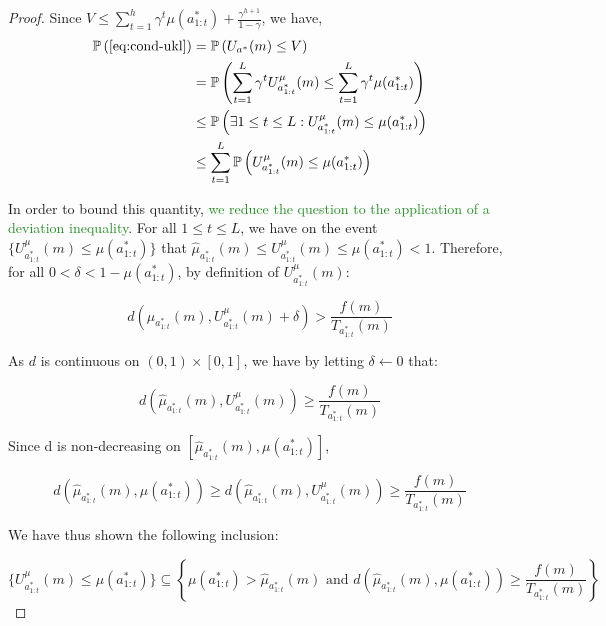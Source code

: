 \documentclass[runningheads]{llncs}
\newcommand{\diff}[1]{\textcolor{ForestGreen}{#1}}
\begin{document}
\begin{proof}
Since $V \leq \sum_{t=1}^h \gamma^t \mu(a^*_{1:t}) + \frac{\gamma^{h+1}}{1-\gamma}$, we have,
\begin{align*}
   \mathbb{P}\left(\eqref{eq:cond-ukl}\right) &=  \mathbb{P}\left(U_{a^*}(m) \leq V\right)\\
    &= \mathbb{P}\left(\sum_{t=1}^L \gamma^t U^{\mu}_{a^*_{1:t}}(m) \leq \sum_{t=1}^L \gamma^t \mu(a^*_{1:t})\right)\\
    &\leq \mathbb{P}\left(\exists 1\leq t \leq L : U^{\mu}_{a^*_{1:t}}(m) \leq \mu(a^*_{1:t})\right) \\
    &\leq \sum_{t=1}^L\mathbb{P}\left(U^{\mu}_{a^*_{1:t}}(m) \leq \mu(a^*_{1:t})\right)
\end{align*}

In order to bound this quantity, \diff{we reduce the question to the application of a deviation inequality}. For all $1\leq t\leq L$, we have on the event $\{U^{\mu}_{a^*_{1:t}}(m) \leq \mu(a^*_{1:t})\}$ that $\hat{\mu}_{a^*_{1:t}}(m) \leq U^{\mu}_{a^*_{1:t}}(m) \leq \mu(a^*_{1:t}) < 1$. Therefore, for all $0 < \delta < 1 - \mu(a^*_{1:t})$, by definition of $U^{\mu}_{a^*_{1:t}}(m)$:

\begin{equation*}
    d(\hat{\mu}_{a^*_{1:t}}(m), U^{\mu}_{a^*_{1:t}}(m)+\delta) > \frac{f(m)}{T_{a^*_{1:t}}(m)}
\end{equation*}

As $d$ is continuous on $(0,1)\times[0, 1]$, we have by letting $\delta \leftarrow 0$ that:

\begin{equation*}
    d(\hat{\mu}_{a^*_{1:t}}(m), U^{\mu}_{a^*_{1:t}}(m)) \geq \frac{f(m)}{T_{a^*_{1:t}}(m)}
\end{equation*}

Since d is non-decreasing on $[\hat{\mu}_{a^*_{1:t}}(m), \mu(a^*_{1:t})]$,

\begin{equation*}
    d(\hat{\mu}_{a^*_{1:t}}(m), \mu(a^*_{1:t})) \geq d(\hat{\mu}_{a^*_{1:t}}(m), U^{\mu}_{a^*_{1:t}}(m)) \geq \frac{f(m)}{T_{a^*_{1:t}}(m)}
\end{equation*}

We have thus shown the following inclusion:

\begin{equation*}
    \{U^{\mu}_{a^*_{1:t}}(m) \leq \mu(a^*_{1:t})\} \subseteq \left\{ \mu(a^*_{1:t}) > \hat{\mu}_{a^*_{1:t}}(m) \text{ and } d(\hat{\mu}_{a^*_{1:t}}(m), \mu(a^*_{1:t})) \geq \frac{f(m)}{T_{a^*_{1:t}}(m)} \right\}
\end{equation*}


\end{proof}
\end{document}
